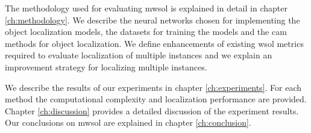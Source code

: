 The methodology used for evaluating \acrlong{mwsol} is explained in detail in chapter \ref{ch:methodology}. We describe the neural networks chosen for implementing the object localization models, the datasets for training the models and the \acrshort{cam} methods for object localization. We define enhancements of existing \acrshort{wsol} metrics required to evaluate localization of multiple instances and we explain an improvement strategy for localizing multiple instances.

We describe the results of our experiments in chapter \ref{ch:experiments}. For each method the computational complexity and localization performance are provided. Chapter \ref{ch:discussion} provides a detailed discussion of the experiment results. Our conclusions on \acrshort{mwsol} are explained in chapter \ref{ch:conclusion}.